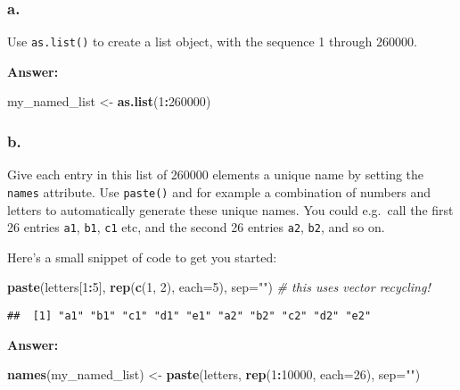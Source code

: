 \documentclass[]{article}
\newenvironment{Shaded}{\begin{snugshade}}{\end{snugshade}}
\newcommand{\CommentTok}[1]{\textcolor[rgb]{0.56,0.35,0.01}{\textit{#1}}}
\newcommand{\DataTypeTok}[1]{\textcolor[rgb]{0.13,0.29,0.53}{#1}}
\newcommand{\DecValTok}[1]{\textcolor[rgb]{0.00,0.00,0.81}{#1}}
\newcommand{\KeywordTok}[1]{\textcolor[rgb]{0.13,0.29,0.53}{\textbf{#1}}}
\newcommand{\NormalTok}[1]{#1}
\newcommand{\OperatorTok}[1]{\textcolor[rgb]{0.81,0.36,0.00}{\textbf{#1}}}
\newcommand{\StringTok}[1]{\textcolor[rgb]{0.31,0.60,0.02}{#1}}
\begin{document}
\hypertarget{a.-2}{%
\subsubsection{a.}\label{a.-2}}

Use \texttt{as.list()} to create a list object, with the sequence 1
through 260000.

\textbf{Answer:}

\begin{Shaded}
\begin{Highlighting}[]
\NormalTok{my_named_list <-}\StringTok{ }\KeywordTok{as.list}\NormalTok{(}\DecValTok{1}\OperatorTok{:}\DecValTok{260000}\NormalTok{)}
\end{Highlighting}
\end{Shaded}

\hypertarget{b.-2}{%
\subsubsection{b.}\label{b.-2}}

Give each entry in this list of 260000 elements a unique name by setting
the \texttt{names} attribute. Use \texttt{paste()} and for example a
combination of numbers and letters to automatically generate these
unique names. You could e.g.~call the first 26 entries \texttt{a1},
\texttt{b1}, \texttt{c1} etc, and the second 26 entries \texttt{a2},
\texttt{b2}, and so on.

Here's a small snippet of code to get you started:

\begin{Shaded}
\begin{Highlighting}[]
\KeywordTok{paste}\NormalTok{(letters[}\DecValTok{1}\OperatorTok{:}\DecValTok{5}\NormalTok{], }\KeywordTok{rep}\NormalTok{(}\KeywordTok{c}\NormalTok{(}\DecValTok{1}\NormalTok{, }\DecValTok{2}\NormalTok{), }\DataTypeTok{each=}\DecValTok{5}\NormalTok{), }\DataTypeTok{sep=}\StringTok{""}\NormalTok{) }\CommentTok{# this uses vector recycling!}
\end{Highlighting}
\end{Shaded}

\begin{verbatim}
##  [1] "a1" "b1" "c1" "d1" "e1" "a2" "b2" "c2" "d2" "e2"
\end{verbatim}

\textbf{Answer:}

\begin{Shaded}
\begin{Highlighting}[]
\KeywordTok{names}\NormalTok{(my_named_list) <-}\StringTok{ }\KeywordTok{paste}\NormalTok{(letters, }\KeywordTok{rep}\NormalTok{(}\DecValTok{1}\OperatorTok{:}\DecValTok{10000}\NormalTok{, }\DataTypeTok{each=}\DecValTok{26}\NormalTok{), }\DataTypeTok{sep=}\StringTok{""}\NormalTok{)}
\end{Highlighting}
\end{Shaded}
\end{document}
